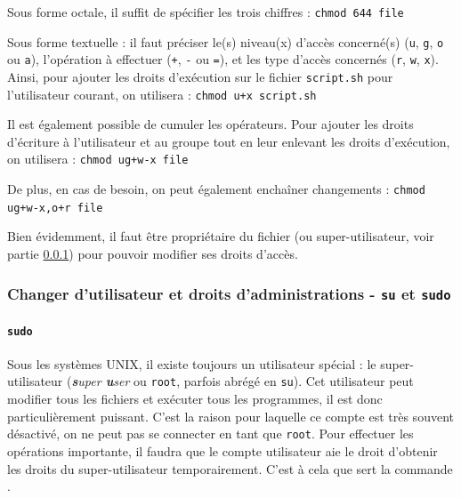 Sous forme octale, il suffit de spécifier les trois chiffres : \texttt{chmod 644 file}
 
Sous forme textuelle : il faut préciser le(s) niveau(x) d'accès concerné(s) (\texttt{u}, \texttt{g}, \texttt{o} ou \texttt{a}), l'opération à effectuer (\texttt{+}, \texttt{-} ou \texttt{=}), et les type d'accès concernés (\texttt{r}, \texttt{w}, \texttt{x}). Ainsi, pour ajouter les droits d'exécution sur le fichier \texttt{script.sh} pour l'utilisateur courant, on utilisera : \texttt{chmod u+x script.sh}

Il est également possible de cumuler les opérateurs. Pour ajouter les droits d'écriture à l'utilisateur et au groupe tout en leur enlevant les droits d'exécution, on utilisera : \texttt{chmod ug+w-x file}

De plus, en cas de besoin, on peut également enchaîner changements : \texttt{chmod ug+w-x,o+r file}

 Bien évidemment, il faut être propriétaire du fichier (ou super-utilisateur, voir partie \ref{sec:su}) pour pouvoir modifier ses droits d'accès.

\newpage
\subsubsection{Changer d'utilisateur et droits d'administrations - \texttt{su} et \texttt{sudo}} \label{sec:su}

\paragraph{\texttt{sudo}} 

Sous les systèmes UNIX, il existe toujours un utilisateur spécial : le super-utilisateur (\textit{\textbf{s}uper \textbf{u}ser} ou \texttt{root}, parfois abrégé en \texttt{su}). Cet utilisateur peut modifier tous les fichiers et exécuter tous les programmes, il est donc particulièrement puissant. C'est la raison pour laquelle ce compte est très souvent désactivé, on ne peut pas se connecter en tant que \texttt{root}. Pour effectuer les opérations importante, il faudra que le compte utilisateur aie le droit d'obtenir les droits du super-utilisateur temporairement. C'est à cela que sert la commande .
\vspace{1em}

\begin{boxed}
\begin{nscenter}
\vspace{-1em}%
\end{nscenter}
\end{boxed}

